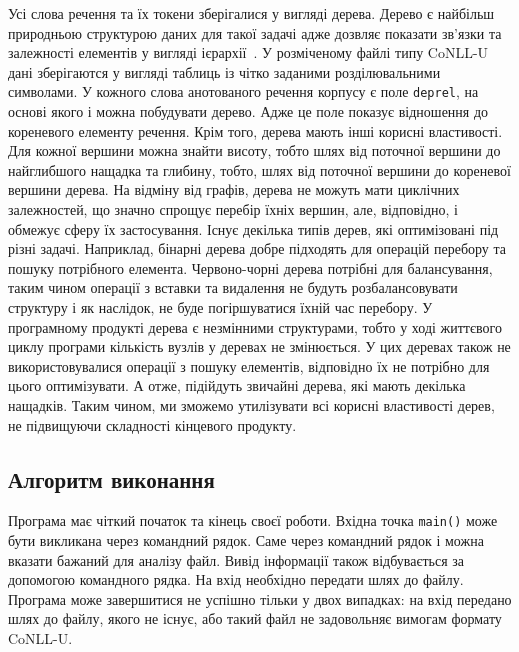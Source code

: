 Усі слова речення та їх токени зберігалися у вигляді дерева. Дерево є найбільш
природньою структурою даних для такої задачі адже дозвляє показати зв'язки
та залежності елементів у вигляді ієрархії~\cite{bib17}. У розміченому файлі
типу CoNLL-U дані зберігаются
у вигляді таблиць із чітко заданими розділювальними символами.
У кожного слова анотованого речення корпусу є поле \texttt{deprel},
на основі якого і можна побудувати дерево. Адже це поле показує відношення до кореневого
елементу речення. Крім того, дерева мають інші корисні властивості. Для кожної вершини
можна знайти висоту, тобто шлях від поточної вершини до найглибшого нащадка та глибину,
тобто, шлях від поточної вершини до кореневої вершини дерева.
На відміну від графів, дерева не можуть мати циклічних залежностей, що
значно спрощує перебір їхніх вершин, але, відповідно, і обмежує сферу їх застосування.
Існує декілька типів дерев, які оптимізовані під різні задачі. Наприклад, бінарні
дерева добре підходять для операцій перебору та пошуку потрібного елемента.
Червоно-чорні дерева потрібні для балансування, таким чином операції з вставки та
видалення не будуть розбалансовувати структуру і як наслідок, не буде погіршуватися
їхній час перебору. У програмному продукті дерева є незмінними структурами, тобто
у ході життєвого циклу програми кількість вузлів у деревах не змінюється. У цих деревах
також не використовувалися операції з пошуку елементів, відповідно їх не потрібно
для цього оптимізувати. А отже, підійдуть звичайні дерева, які мають декілька
нащадків. Таким чином, ми зможемо утилізувати всі корисні властивості дерев,
не підвищуючи складності кінцевого продукту.

\subsection{Алгоритм виконання}
Програма має чіткий початок та кінець своєї роботи. Вхідна точка \texttt{main()} може
бути викликана через командний рядок. Саме через командний рядок і можна вказати бажаний
для аналізу файл. Вивід інформації також відбувається за допомогою командного
рядка. На вхід необхідно передати шлях до файлу. Програма може завершитися не успішно
тільки у двох випадках: на вхід передано шлях до файлу, якого не існує, або такий
файл не задовольняє вимогам формату CoNLL-U.

